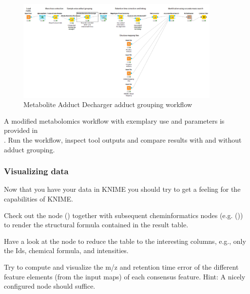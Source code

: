 \begin{figure}[htbp]
  \centering
  \includegraphics[width=0.90\textwidth]{graphics/metabo/mad.png}
  \caption{Metabolite Adduct Decharger adduct grouping workflow}
  \label{fig:mad}
\end{figure}

\begin{task}
A modified metabolomics workflow with exemplary  use and parameters is provided in\\ . Run the workflow, inspect tool outputs and compare  results with and without adduct grouping.
\end{task}

\subsubsection{Visualizing data}

Now that you have your data in KNIME you should try to get a feeling for the capabilities of KNIME.

\begin{task}
Check out the   node () together with subsequent cheminformatics nodes (e.g.  ()) to render the structural formula contained in the result table.

\end{task}
\begin{task}
Have a look at the  node to reduce the table to the interesting columns, e.g., only the Ids, chemical formula, and intensities.
\end{task}
\begin{task}
Try to compute and visualize the m/z and retention time error of the different feature elements (from the input maps) of each consensus feature. Hint: A nicely configured  node should suffice.
\end{task}


